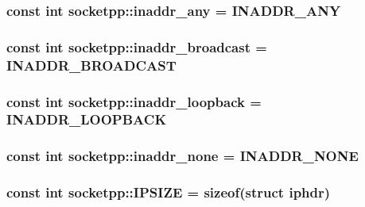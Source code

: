 \hypertarget{namespacesocketpp_5200e43bde971e8003068a622cba2f58}{
\subsubsection[{inaddr\_\-any}]{\setlength{\rightskip}{0pt plus 5cm}const int {\bf socketpp::inaddr\_\-any} = INADDR\_\-ANY}}
\label{namespacesocketpp_5200e43bde971e8003068a622cba2f58}


\hypertarget{namespacesocketpp_733551c5151802fc12691a868a366a5f}{
\subsubsection[{inaddr\_\-broadcast}]{\setlength{\rightskip}{0pt plus 5cm}const int {\bf socketpp::inaddr\_\-broadcast} = INADDR\_\-BROADCAST}}
\label{namespacesocketpp_733551c5151802fc12691a868a366a5f}


\hypertarget{namespacesocketpp_8a9e04cf907ec163f43cf6c3bf9e213c}{
\subsubsection[{inaddr\_\-loopback}]{\setlength{\rightskip}{0pt plus 5cm}const int {\bf socketpp::inaddr\_\-loopback} = INADDR\_\-LOOPBACK}}
\label{namespacesocketpp_8a9e04cf907ec163f43cf6c3bf9e213c}


\hypertarget{namespacesocketpp_26bb72049a9cf272f6c116b0a2187c0b}{
\subsubsection[{inaddr\_\-none}]{\setlength{\rightskip}{0pt plus 5cm}const int {\bf socketpp::inaddr\_\-none} = INADDR\_\-NONE}}
\label{namespacesocketpp_26bb72049a9cf272f6c116b0a2187c0b}


\hypertarget{namespacesocketpp_1beda002d2e23bf757355444fd9279e2}{
\subsubsection[{IPSIZE}]{\setlength{\rightskip}{0pt plus 5cm}const int {\bf socketpp::IPSIZE} = sizeof(struct iphdr)}}
\label{namespacesocketpp_1beda002d2e23bf757355444fd9279e2}


